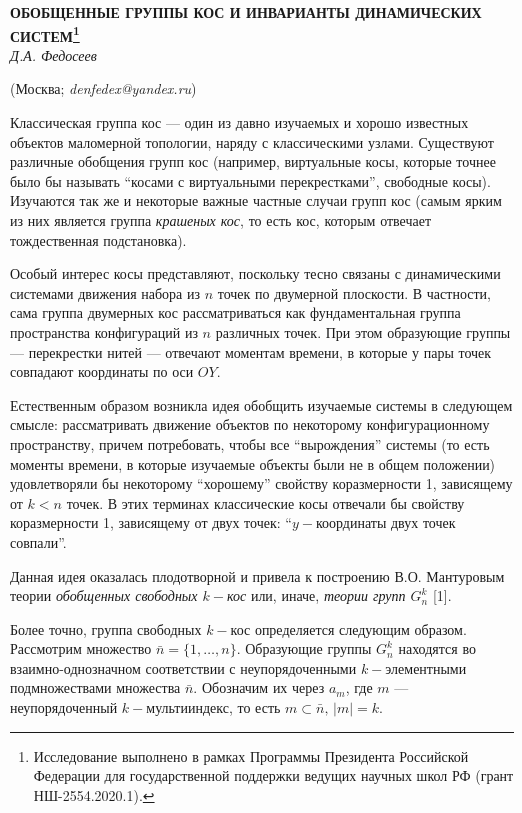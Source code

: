 
\begin{center}
    {\bf ОБОБЩЕННЫЕ ГРУППЫ КОС И ИНВАРИАНТЫ ДИНАМИЧЕСКИХ СИСТЕМ\footnote{Исследование выполнено в рамках Программы Президента Российской Федерации для государственной поддержки ведущих научных школ РФ (грант НШ-2554.2020.1).}}\\

    {\it Д.А. Федосеев}

    (Москва; {\it denfedex@yandex.ru})
\end{center}


Классическая группа кос --- один из давно изучаемых и хорошо известных объектов маломерной топологии, наряду с классическими узлами. Существуют различные обобщения групп кос (например, виртуальные косы, которые точнее было бы называть ``косами с виртуальными перекрестками'', свободные косы). Изучаются так же и некоторые важные частные случаи групп кос (самым ярким из них является группа {\em крашеных кос}, то есть кос, которым отвечает тождественная подстановка).

Особый интерес косы представляют, поскольку тесно связаны с динамическими системами движения набора из $n$ точек по двумерной плоскости. В частности, сама группа двумерных кос рассматриваться как фундаментальная группа пространства конфигураций из $n$ различных точек. При этом образующие группы --- перекрестки нитей --- отвечают моментам времени, в которые у пары точек совпадают координаты по оси $OY$.

Естественным образом возникла идея обобщить изучаемые системы в следующем смысле: рассматривать движение объектов по некоторому конфигурационному пространству, причем потребовать, чтобы все ``вырождения'' системы (то есть моменты времени, в которые изучаемые объекты были не в общем положении) удовлетворяли бы некоторому ``хорошему'' свойству коразмерности 1, зависящему от $k<n$ точек. В этих терминах классические косы отвечали бы свойству коразмерности 1, зависящему от двух точек: ``$y-$координаты двух точек совпали''.

Данная идея оказалась плодотворной и привела к построению В.О. Мантуровым теории {\em обобщенных свободных $k-$кос} или, иначе, {\em теории групп $G_n^k$} [1].

Более точно, группа свободных $k-$кос определяется следующим образом. Рассмотрим множество $\bar{n}=\{1,\dots, n\}$. Образующие группы $G_n^k$ находятся во взаимно-однозначном соответствии с неупорядоченными $k-$элементными подмножествами множества $\bar{n}$. Обозначим их через $a_m$, где $m$ --- неупорядоченный $k-$мультииндекс, то есть $m\subset \bar{n}, \, |m|=k$.

